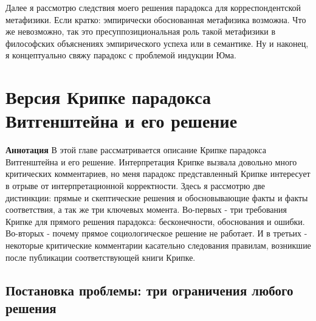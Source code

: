 \documentclass[12pt]{book}
\begin{document}
Далее я рассмотрю следствия моего решения парадокса для корреспондентской метафизики. Если кратко: эмпирически обоснованная метафизика возможна. Что же невозможно, так это пресуппозициональная роль такой метафизики в философских объяснениях эмпирического успеха или в семантике. Ну и наконец, я концептуально свяжу парадокс с проблемой индукции Юма.

\chapter{Версия Крипке парадокса Витгенштейна и его решение}

\qquad

\textbf{Аннотация} \quad В этой главе рассматривается описание Крипке парадокса Витгенштейна и его решение. Интерпретация Крипке вызвала довольно много критических комментариев, но меня парадокс представленный Крипке интересует в отрыве от интерпретационной корректности. Здесь я рассмотрю две дистинкции: прямые и скептические решения и обосновывающие факты и факты соответствия, а так же три ключевых момента. Во-первых - три требования Крипке для прямого решения парадокса: бесконечности, обоснования и ошибки. Во-вторых - почему прямое социологическое решение не работает. И в третьих - некоторые критические комментарии касательно следования правилам, возникшие после публикации соответствующей книги Крипке.

\qquad

\section{Постановка проблемы: три ограничения любого решения}
\end{document}
